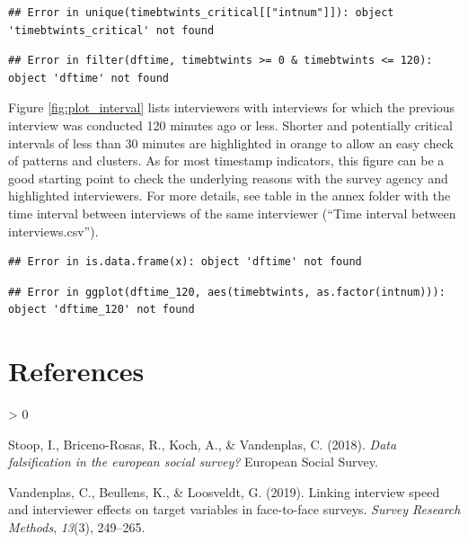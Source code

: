 \documentclass[
  11pt,
  a4paperpaper,
]{article}
\let\stdsection\section
\renewcommand{\section}{\FloatBarrier\clearpage\FloatBarrier\stdsection}
\newlength{\cslhangindent}
\newenvironment{CSLReferences}[2] %
 {%
  \setlength{\parindent}{0pt}
  \ifodd #1 \everypar{\setlength{\hangindent}{\cslhangindent}}\ignorespaces\fi
  \ifnum #2 > 0
  \setlength{\parskip}{#2\baselineskip}
  \fi
 }%
 {}
\begin{document}
\begin{verbatim}
## Error in unique(timebtwints_critical[["intnum"]]): object 'timebtwints_critical' not found
\end{verbatim}

\begin{verbatim}
## Error in filter(dftime, timebtwints >= 0 & timebtwints <= 120): object 'dftime' not found
\end{verbatim}

Figure \ref{fig:plot_interval} lists interviewers with interviews for
which the previous interview was conducted 120 minutes ago or less.
Shorter and potentially critical intervals of less than 30 minutes are
highlighted in orange to allow an easy check of patterns and clusters.
As for most timestamp indicators, this figure can be a good starting
point to check the underlying reasons with the survey agency and
highlighted interviewers. For more details, see table in the annex
folder with the time interval between interviews of the same interviewer
(``Time interval between interviews.csv'').

\begin{verbatim}
## Error in is.data.frame(x): object 'dftime' not found
\end{verbatim}

\begin{verbatim}
## Error in ggplot(dftime_120, aes(timebtwints, as.factor(intnum))): object 'dftime_120' not found
\end{verbatim}

\newpage

\hypertarget{references}{%
\section*{References}\label{references}}

\hypertarget{refs}{}
\begin{CSLReferences}{1}{0}
\leavevmode\hypertarget{ref-stoop2018}{}%
Stoop, I., Briceno-Rosas, R., Koch, A., \& Vandenplas, C. (2018).
\emph{Data falsification in the european social survey?} European Social
Survey.

\leavevmode\hypertarget{ref-vandenplas2019}{}%
Vandenplas, C., Beullens, K., \& Loosveldt, G. (2019). Linking interview
speed and interviewer effects on target variables in face-to-face
surveys. \emph{Survey Research Methods}, \emph{13}(3), 249--265.

\end{CSLReferences}
\end{document}
